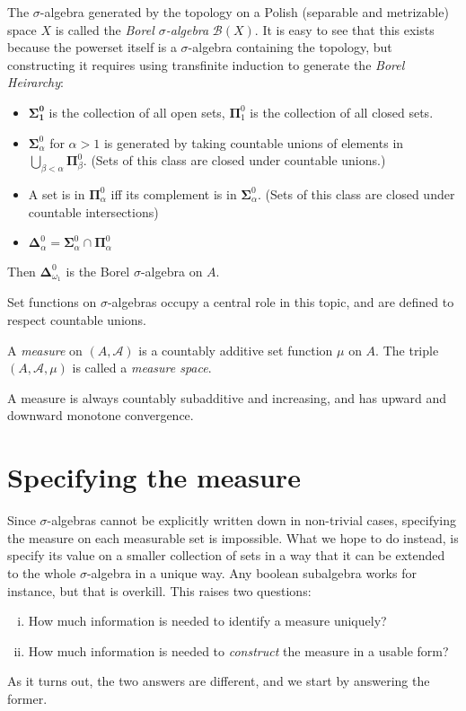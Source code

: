 \documentclass[9pt]{report}
\newlength{\tindent}
\newtheorem[L]{theorem}{Theorem}[chapter]
\newtheorem[L,nocut]{definition}[theorem]{Definition}
\newtheorem[S,nounderline]{remark}[theorem]{Remarks}
\newenvironment{Example}{ 
	\setlength{\parindent}{\tindent}
\begin{example}}
{\end{example} \setlength{\parindent}{0pt}}
\begin{document}
\begin{Example}
	The \(\sigma\)-algebra generated by the topology on a Polish (separable and metrizable) space \(X\) is called the \emph{Borel \(\sigma\)-algebra} \(\mathcal{B}(X)\). It is easy to see that this exists because the powerset itself is a \(\sigma\)-algebra containing the topology, but constructing it requires using transfinite induction to generate the \emph{Borel Heirarchy}: 
	\begin{itemize}
		\item \(\mathbf{\Sigma^0_1}\) is the collection of all open sets, \(\mathbf{\Pi}^0_1\) is the collection of all closed sets.
		\item \(\mathbf{\Sigma}^0_\alpha\) for \(\alpha > 1\) is generated by taking countable unions of elements in \(\bigcup_{\beta < \alpha} \mathbf{\Pi}^0_\beta\). (Sets of this class are closed under countable unions.)
		\item A set is in \(\mathbf{\Pi}^0_\alpha\) iff its complement is in \(\mathbf{\Sigma}^0_\alpha\). (Sets of this class are closed under countable intersections)
		\item \(\mathbf{\Delta}^0_{\alpha} = \mathbf{\Sigma}^0_\alpha \cap \mathbf{\Pi}^0_\alpha\)
	\end{itemize} 
        Then \(\mathbf{\Delta}^0_{\omega_1}\) is the Borel \(\sigma\)-algebra on \(A\). 
\end{Example}

Set functions on \(\sigma\)-algebras occupy a central role in this topic, and are defined to respect countable unions.

\begin{definition}[Measure]
A \emph{measure} on \((A,\mathcal{A})\) is a countably additive set function \(\mu\) on \(A\).
The triple \((A,\mathcal{A},\mu)\) is called a \emph{measure space}. 
\end{definition}

\begin{remark}
	A measure is always countably subadditive and increasing, and has upward and downward monotone convergence.
\end{remark}

\section{Specifying the measure}

Since \(\sigma\)-algebras cannot be explicitly written down in non-trivial cases, specifying the measure on each measurable set is impossible. What we hope to do instead, is specify its value on a smaller collection of sets in a way that it can be extended to the whole \(\sigma\)-algebra in a unique way. Any boolean subalgebra works for instance, but that is overkill. This raises two questions: 
\begin{enumerate}[(i)]
	\item How much information is needed to identify a measure uniquely?
	\item How much information is needed to \emph{construct} the measure in a usable form?
\end{enumerate}
As it turns out, the two answers are different, and we start by answering the former. 
 
\end{document}
